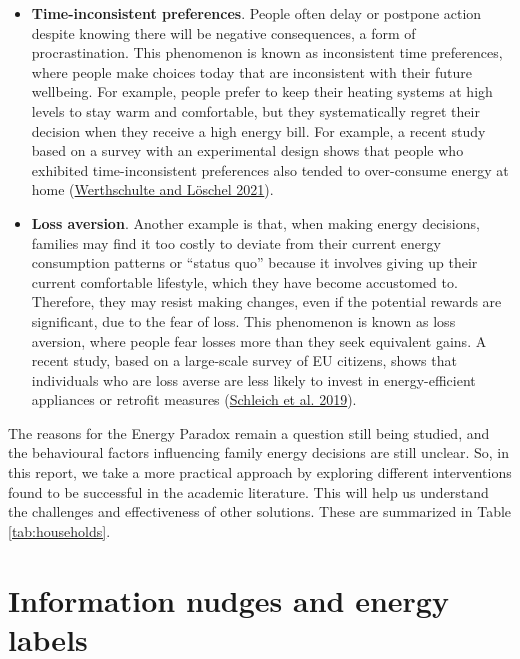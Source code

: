 \documentclass[
  12pt,
  captions=heading]{scrreport}
\begin{document}
\begin{itemize}
\item
  \textbf{Time-inconsistent preferences}. People often delay or postpone
  action despite knowing there will be negative consequences, a form of
  procrastination. This phenomenon is known as inconsistent time
  preferences, where people make choices today that are inconsistent
  with their future wellbeing. For example, people prefer to keep their
  heating systems at high levels to stay warm and comfortable, but they
  systematically regret their decision when they receive a high energy
  bill. For example, a recent study based on a survey with an
  experimental design shows that people who exhibited time-inconsistent
  preferences also tended to over-consume energy at home
  (\protect\hyperlink{ref-werthschulte2021role}{Werthschulte and Löschel
  2021}).
\item
  \textbf{Loss aversion}. Another example is that, when making energy
  decisions, families may find it too costly to deviate from their
  current energy consumption patterns or ``status quo'' because it
  involves giving up their current comfortable lifestyle, which they
  have become accustomed to. Therefore, they may resist making changes,
  even if the potential rewards are significant, due to the fear of
  loss. This phenomenon is known as loss aversion, where people fear
  losses more than they seek equivalent gains. A recent study, based on
  a large-scale survey of EU citizens, shows that individuals who are
  loss averse are less likely to invest in energy-efficient appliances
  or retrofit measures
  (\protect\hyperlink{ref-schleich2019large}{Schleich et al. 2019}).
\end{itemize}

The reasons for the Energy Paradox remain a question still being
studied, and the behavioural factors influencing family energy decisions
are still unclear. So, in this report, we take a more practical approach
by exploring different interventions found to be successful in the
academic literature. This will help us understand the challenges and
effectiveness of other solutions. These are summarized in Table
\ref{tab:households}.

\hypertarget{information-nudges-and-energy-labels}{%
\section{Information nudges and energy
labels}\label{information-nudges-and-energy-labels}}
\end{document}
